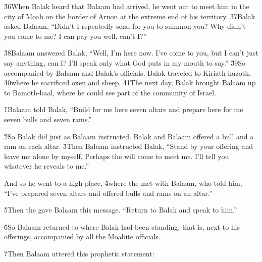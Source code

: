 \v{36}When Balak heard that Balaam had arrived, he went out to meet him in the city of Moab on the border of Arnon at the extreme end of his territory. \v{37}Balak asked Balaam, ``Didn't I repeatedly send for you to summon you? Why didn't you come to me? I can pay you well, can't I?''

\v{38}Balaam answered Balak, ``Well, I'm here now. I've come to you, but I can't just say anything, can I? I'll speak only what God puts in my mouth to say.'' \v{39}So accompanied by Balaam and Balak's officials, Balak traveled to Kiriath-huzoth, \v{40}where he sacrificed oxen and sheep. \v{41}The next day, Balak brought Balaam up to Bamoth-baal, where he could see part of the community of Israel.

\v{1}Balaam told Balak, ``Build for me here seven altars and prepare here for me seven bulls and seven rams.''

\v{2}So Balak did just as Balaam instructed. Balak and Balaam offered a bull and a ram on each altar. \v{3}Then Balaam instructed Balak, ``Stand by your offering and leave me alone by myself. Perhaps the  will come to meet me. I'll tell you whatever he reveals to me.''

And so he went to a high place, \v{4}where the  met with Balaam, who told him, ``I've prepared seven altars and offered bulls and rams on an altar.''

\v{5}Then the  gave Balaam this message. ``Return to Balak and speak to him.''

\v{6}So Balaam returned to where Balak had been standing, that is, next to his offerings, accompanied by all the Moabite officials.

\v{7}Then Balaam uttered this prophetic statement:

